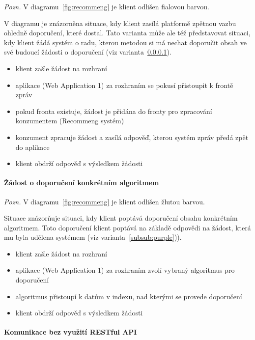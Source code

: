 \documentclass[thesis=M,czech]{FITthesis}[2014/05/07]
\begin{document}
\emph{Pozn.} V diagramu~\ref{fig:recommeng} je klient odlišen fialovou barvou.

V diagramu je znázorněna situace, kdy klient zasílá platformě zpětnou vazbu ohledně doporučení, které dostal. Tato varianta může ale též představovat situaci, kdy klient žádá systém o radu, kterou metodou si má nechat doporučit obsah ve své budoucí žádosti o doporučení (viz varianta~\ref{subsub:yellow}).

\begin{itemize}
	\item klient zašle žádost na rozhraní
	\item aplikace (Web Application 1) za rozhraním se pokusí přistoupit k frontě zpráv
	\item pokud fronta existuje, žádost je přidána do fronty pro zpracování konzumentem (Recommeng systém)
	\item konzument zpracuje žádost a zasílá odpověď, kterou systém zpráv předá zpět do aplikace
	\item klient obdrží odpověď s výsledkem žádosti
\end{itemize}

\paragraph{Žádost o doporučení konkrétním algoritmem}
\label{subsub:yellow}

\emph{Pozn.} V diagramu~\ref{fig:recommeng} je klient odlišen žlutou barvou.

Situace znázorňuje situaci, kdy klient poptává doporučení obsahu konkrétním algoritmem. Toto doporučení klient poptává na základě odpovědi na žádost, která mu byla udělena systémem (viz varianta~\ref{subsub:purple})). 

\begin{itemize}
	\item klient zašle žádost na rozhraní
	\item aplikace (Web Application 1) za rozhraním zvolí vybraný algoritmus pro doporučení
	\item algoritmus přistoupí k datům v indexu, nad kterými se provede doporučení
	\item klient obdrží odpověď s výsledkem žádosti
\end{itemize}

\paragraph{Komunikace bez využití RESTful API}
\end{document}
